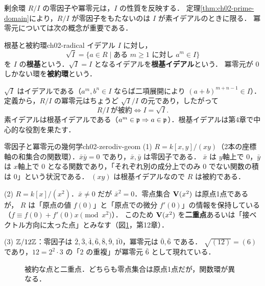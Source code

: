 剰余環 $R/I$ の零因子や冪零元は，$I$ の性質を反映する．
定理\ref{thm:ch02-prime-domain}により，$R/I$ が零因子をもたないのは $I$ が素イデアルのときに限る．
冪零元については次の概念が重要である．

\begin{mydef}{根基と被約環}{ch02-radical}
イデアル $I$ に対し，
\[
  \sqrt{I}=\{a\in R\mid \text{ある }m\ge1\text{ に対し }a^m\in I\}
\]
を $I$ の\textbf{根基}という．$\sqrt I=I$ となるイデアルを\textbf{根基イデアル}という．
冪零元が $0$ しかない環を\textbf{被約環}という．
\end{mydef}

$\sqrt I$ はイデアルである（$a^m,b^n\in I$ ならば二項展開により $(a+b)^{m+n-1}\in I$）．
定義から，$R/I$ の冪零元はちょうど $\sqrt I/I$ の元であり，したがって
\[
  R/I\ \text{が被約}\iff I=\sqrt I.
\]
素イデアルは根基イデアルである（$a^m\in\mathfrak{p}\Rightarrow a\in\mathfrak{p}$）．根基イデアルは第4章で中心的な役割を果たす．

\begin{myex}{零因子と冪零元の幾何学}{ch02-zerodiv-geom}
(1) $R=k[x,y]/(xy)$（2本の座標軸の和集合の関数環）．$\bar x\bar y=0$ であり，$\bar x,\bar y$ は零因子である．
$\bar x$ は $y$軸上で $0$，$\bar y$ は $x$軸上で $0$ となる関数であり，「それぞれ別の成分上でのみ $0$ でない関数の積は $0$」という状況である．
$(xy)$ は根基イデアルなので $R$ は被約である．

(2) $R=k[x]/(x^2)$．$\bar x\ne0$ だが $\bar x^2=0$．零点集合 $\mathbf{V}(x^2)$ は原点1点であるが，
$R$ は「原点の値 $f(0)$」と「原点での微分 $f'(0)$」の情報を保持している（$f\equiv f(0)+f'(0)x\pmod{x^2}$）．
このため $\mathbf{V}(x^2)$ を\textbf{二重点}あるいは「接ベクトル方向に太った点」とみなす（図\ref{fig:ch02-double-point}，第12章）．

(3) $\mathbb{Z}/12\mathbb{Z}$：零因子は $\bar2,\bar3,\bar4,\bar6,\bar8,\bar9,\bar{10}$，冪零元は $\bar0,\bar6$ である．
$\sqrt{(12)}=(6)$ であり，$12=2^2\cdot3$ の「$2$ の重複」が冪零元 $\bar6$ として現れている．
\end{myex}

\begin{figure}[H]
\centering
{}
\caption{被約な点と二重点．どちらも零点集合は原点1点だが，関数環が異なる．}
\label{fig:ch02-double-point}
\end{figure}

